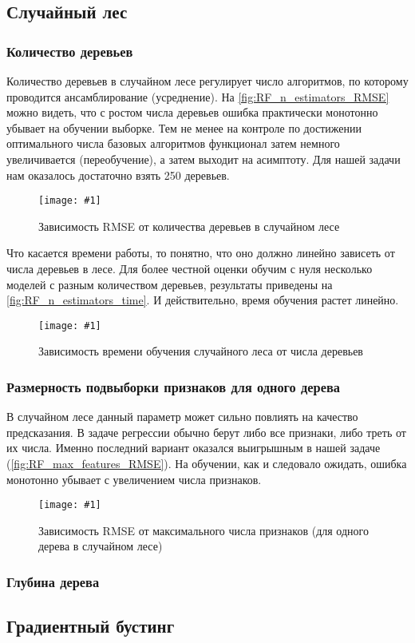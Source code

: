 \documentclass[12pt]{article}
\newcommand{\mpl}[2]{
    \begin{figure}[!h]
        \texttt{[image: \#1]}
        \centering
        \caption{#2}
        \label{fig:#1}
     \end{figure}
}
\begin{document}
\subsection{Случайный лес}
\subsubsection{Количество деревьев}
Количество деревьев в случайном лесе регулирует число алгоритмов, по которому проводится ансамблирование (усреднение). На \autoref{fig:RF_n_estimators_RMSE} можно видеть, что с ростом числа деревьев ошибка практически монотонно убывает на обучении выборке. Тем не менее на контроле по достижении оптимального числа базовых алгоритмов функционал затем немного увеличивается (переобучение), а затем выходит на асимптоту. Для нашей задачи нам оказалось достаточно взять 250 деревьев.

\mpl{RF_n_estimators_RMSE}{Зависимость RMSE от количества деревьев в случайном лесе}

Что касается времени работы, то понятно, что оно должно линейно зависеть от числа деревьев в лесе. Для более честной оценки обучим с нуля несколько моделей с разным количеством деревьев, результаты приведены на \autoref{fig:RF_n_estimators_time}. И действительно, время обучения растет линейно.
\mpl{RF_n_estimators_time}{Зависимость времени обучения случайного леса от числа деревьев}

\subsubsection{Размерность подвыборки признаков для одного дерева}
В случайном лесе данный параметр может сильно повлиять на качество предсказания. В задаче регрессии обычно берут либо все признаки, либо треть от их числа. Именно последний вариант оказался выигрышным в нашей задаче (\autoref{fig:RF_max_features_RMSE}). На обучении, как и следовало ожидать, ошибка монотонно убывает с увеличением числа признаков.
\mpl{RF_max_features_RMSE}{Зависимость RMSE от максимального числа признаков (для одного дерева в случайном лесе)}


\subsubsection{Глубина дерева}

\subsection{Градиентный бустинг}
\end{document}
